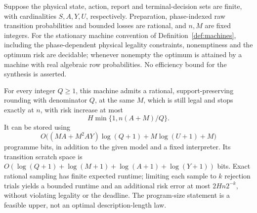 \begin{theorem}\label{thm:finite_compiler}
Suppose the physical state, action, report and terminal-decision sets are finite, with cardinalities $S,A,Y,U$, respectively. Preparation, phase-indexed raw transition probabilities and bounded losses are rational, and $n,M$ are fixed integers. For the stationary machine convention of Definition~\ref{def:machines}, including the phase-dependent physical legality constraints, nonemptiness and the optimum risk are decidable; whenever nonempty the optimum is attained by a machine with real algebraic row probabilities. No efficiency bound for the synthesis is asserted.

For every integer $Q\ge1$, this machine admits a rational, support-preserving rounding with denominator $Q$, at the same $M$, which is still legal and stops exactly at $n$, with risk increase at most
\begin{equation}\label{eq:compiler_error}
 H\min\{1,n(A+M)/Q\}.
\end{equation}
It can be stored using
\[
 O\big((MA+M^2AY)\log(Q+1)+M\log(U+1)+M\big)
\]
programme bits, in addition to the given model and a fixed interpreter. Its transition scratch space is
$O(\log(Q+1)+\log(M+1)+\log(A+1)+\log(Y+1))$ bits. Exact rational sampling has finite expected runtime; limiting each sample to $k$ rejection trials yields a bounded runtime and an additional risk error at most $2Hn2^{-k}$, without violating legality or the deadline. The program-size statement is a feasible upper, not an optimal description-length law.
\end{theorem}

